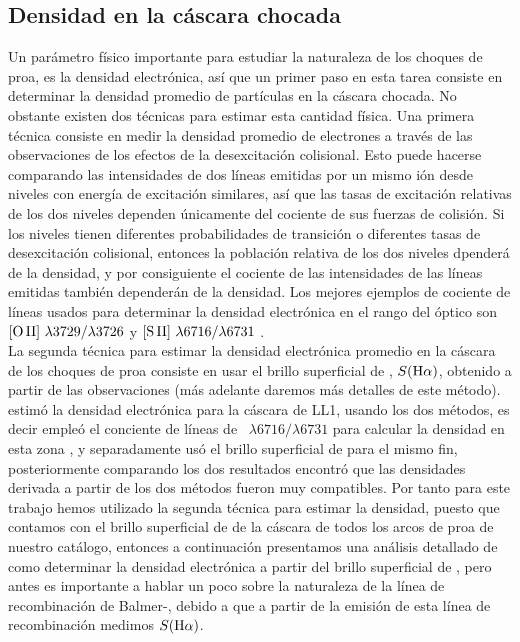 \subsection{Densidad  en la cáscara chocada }
\label{sec:densinty}

Un parámetro físico importante para estudiar la naturaleza de los choques de proa, es la densidad electrónica, así que un primer paso en esta tarea consiste en determinar la densidad promedio de partículas en la cáscara chocada. No obstante existen dos técnicas para estimar esta cantidad física. Una primera técnica consiste en medir la densidad promedio de electrones a través de las observaciones de los efectos de la desexcitación colisional. Esto puede hacerse comparando las intensidades de dos líneas emitidas por un mismo ión desde niveles con energía de excitación similares, así que las tasas de excitación relativas de los dos niveles dependen únicamente del cociente de sus fuerzas de colisión. Si los niveles tienen diferentes probabilidades de transición o diferentes tasas de desexcitación colisional, entonces la población relativa de los dos niveles dpenderá de la densidad, y por consiguiente el cociente de las intensidades de las líneas emitidas también dependerán de la densidad. Los mejores ejemplos de cociente de líneas usados para determinar la densidad electrónica en el rango del óptico son \(\mathrm{[O\,II]}~\lambda 3729/\lambda 3726\) y \(\mathrm{[S\,II]}~\lambda 6716/\lambda 6731\) \citep{Osterbrock:1989}.\\

La segunda técnica para estimar la densidad electrónica promedio en la cáscara de los choques de proa consiste en usar el brillo superficial de \ha{}, \(S(\mathrm{H}\alpha{})\), obtenido a partir de las observaciones (más adelante daremos más detalles de este método). \citet{Henney:2013a} estimó la densidad electrónica para la cáscara de LL1, usando los dos métodos, es decir empleó el conciente de líneas de \sii{}~\(\lambda 6716/\lambda 6731\) para calcular la densidad en esta zona , y separadamente usó el brillo superficial de \ha{} para el mismo fin, posteriormente comparando los dos resultados encontró que las densidades derivada a partir de los dos métodos fueron muy compatibles. Por tanto para este trabajo hemos utilizado la segunda técnica para estimar la densidad, puesto que contamos con el brillo superficial de \ha{} de la cáscara de todos los arcos de proa de nuestro catálogo, entonces a continuación presentamos una análisis detallado de como determinar la densidad electrónica a partir del brillo superficial de \ha{}, pero antes es importante a hablar un poco sobre la naturaleza de la línea de recombinación de Balmer-\ha{}, debido a que a partir de la emisión de esta línea de recombinación medimos \(S(\mathrm{H}\alpha{})\).    

